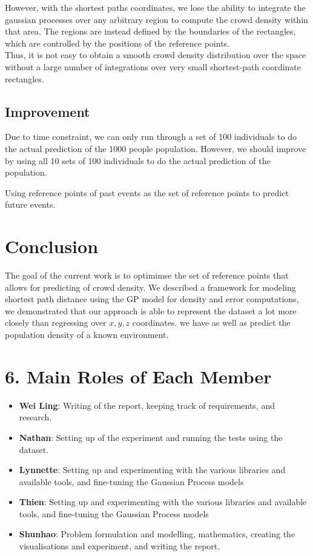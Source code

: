 \documentclass[letterpaper]{article}
\begin{document}
However, with the shortest paths coordinates, we lose the ability to integrate the gaussian processes over any arbitrary region to compute the crowd density within that area. The regions are instead defined by the boundaries of the rectangles, which are controlled by the positions of the reference points.\\

Thus, it is not easy to obtain a smooth crowd density distribution over the space without a large number of integrations over very small shortest-path coordinate rectangles.\\


\subsection{Improvement}

Due to time constraint, we can only run through a set of 100 individuals to do the actual prediction of the 1000 people population. However, we should improve by using all 10 sets of 100 individuals to do the actual prediction of the population.

Using reference points of past events as the set of reference points to predict future events.


\section{Conclusion}

The goal of the current work is to optimimse the set of reference points that allows for predicting of crowd density. We described a framework for modeling shortest path distance using the GP model for density and error computations, we demonstrated that our approach is able to represent the dataset a lot more closely than regressing over $x,y,z$ coordinates. we have as well as predict the population density of a known environment.

\section{6. Main Roles of Each Member}
\begin{itemize}
\item \textbf{Wei Ling}: 
Writing of the report, keeping track of requirements, and research.
\item \textbf{Nathan}: 
Setting up of the experiment and running the tests using the dataset.
\item \textbf{Lynnette}: 
Setting up and experimenting with the various libraries and available tools, and fine-tuning the Gaussian Process models
\item \textbf{Thien}: 
Setting up and experimenting with the various libraries and available tools, and fine-tuning the Gaussian Process models
\item \textbf{Shunhao}: 
Problem formulation and modelling, mathematics, creating the visualisations and experiment, and writing the report.
\end{itemize}



\end{document}
